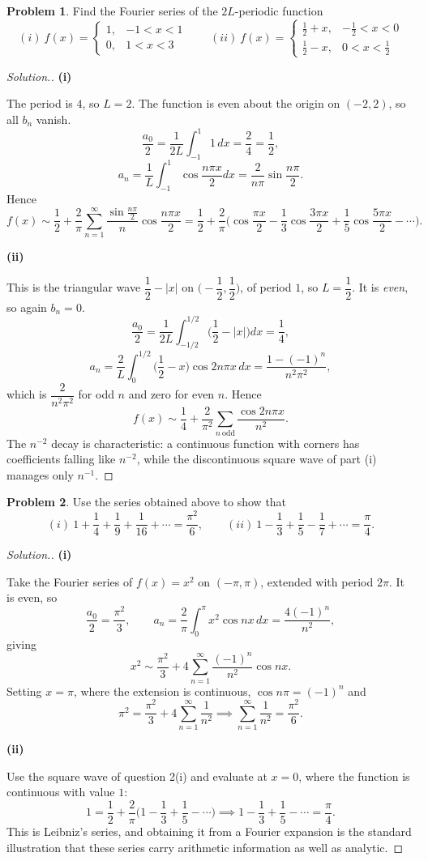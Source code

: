 \documentclass[11pt,a4paper]{article}
\theoremstyle{definition}
\newtheorem{problemx}{Problem}[subsection]
\newenvironment{problem}{\begin{problemx}}{\end{problemx}}
\newenvironment{solution}
  {\renewcommand{\qedsymbol}{}\begin{proof}[\textit{Solution}.]}
  {\end{proof}}
\newcommand{\subhead}[1]{%
  \par\medskip\noindent\textbf{#1}\par\nobreak\smallskip}
\begin{document}
\begin{problem}
Find the Fourier series of the $2L$-periodic function
$$(i)\ f(x) = \begin{cases}1, & -1<x<1\\ 0, & 1<x<3\end{cases}
\qquad
(ii)\ f(x) = \begin{cases}\frac12+x, & -\frac12<x<0\\
\frac12-x, & 0<x<\frac12\end{cases}$$
\end{problem}
\begin{solution}
\subhead{(i)}
The period is $4$, so $L = 2$. The function is even about the origin on
$(-2,2)$, so all $b_n$ vanish.
$$\frac{a_0}{2} = \frac{1}{2L}\int_{-1}^{1}1\,dx = \frac{2}{4} = \frac12 ,$$
$$a_n = \frac1L\int_{-1}^{1}\cos\frac{n\pi x}{2}dx
= \frac{2}{n\pi}\sin\frac{n\pi}{2}.$$
Hence
$$f(x)\sim\frac12 + \frac{2}{\pi}\sum_{n=1}^{\infty}
\frac{\sin\frac{n\pi}{2}}{n}\cos\frac{n\pi x}{2}
= \frac12 + \frac{2}{\pi}\Big(\cos\frac{\pi x}{2}
- \frac13\cos\frac{3\pi x}{2} + \frac15\cos\frac{5\pi x}{2} - \cdots\Big).$$

\subhead{(ii)}
This is the triangular wave $\dfrac12-\left|x\right|$ on
$\Big(-\dfrac12,\dfrac12\Big)$, of period $1$, so $L = \dfrac12$. It is
\emph{even}, so again $b_n = 0$.
$$\frac{a_0}{2} = \frac{1}{2L}\int_{-1/2}^{1/2}\Big(\frac12-\left|x\right|\Big)dx
= \frac14 ,$$
$$a_n = \frac{2}{L}\int_0^{1/2}\Big(\frac12-x\Big)\cos 2n\pi x\,dx
= \frac{1-(-1)^n}{n^2\pi^2},$$
which is $\dfrac{2}{n^2\pi^2}$ for odd $n$ and zero for even $n$. Hence
$$f(x)\sim\frac14 + \frac{2}{\pi^2}\sum_{n\ \text{odd}}
\frac{\cos 2n\pi x}{n^2}.$$
The $n^{-2}$ decay is characteristic: a continuous function with corners has
coefficients falling like $n^{-2}$, while the discontinuous square wave of part
(i) manages only $n^{-1}$.
\end{solution}

\begin{problem}
Use the series obtained above to show that
$$(i)\ 1+\frac14+\frac19+\frac{1}{16}+\cdots = \frac{\pi^2}{6},
\qquad
(ii)\ 1-\frac13+\frac15-\frac17+\cdots = \frac{\pi}{4}.$$
\end{problem}
\begin{solution}
\subhead{(i)}
Take the Fourier series of $f(x) = x^2$ on $(-\pi,\pi)$, extended with period
$2\pi$. It is even, so
$$\frac{a_0}{2} = \frac{\pi^2}{3},\qquad
a_n = \frac{2}{\pi}\int_0^{\pi}x^2\cos nx\,dx = \frac{4(-1)^n}{n^2},$$
giving
$$x^2 \sim \frac{\pi^2}{3} + 4\sum_{n=1}^{\infty}\frac{(-1)^n}{n^2}\cos nx .$$
Setting $x = \pi$, where the extension is continuous, $\cos n\pi = (-1)^n$ and
$$\pi^2 = \frac{\pi^2}{3} + 4\sum_{n=1}^{\infty}\frac{1}{n^2}
\implies \sum_{n=1}^{\infty}\frac{1}{n^2} = \frac{\pi^2}{6}.$$

\subhead{(ii)}
Use the square wave of question 2(i) and evaluate at $x=0$, where the function
is continuous with value $1$:
$$1 = \frac12 + \frac{2}{\pi}\Big(1-\frac13+\frac15-\cdots\Big)
\implies 1-\frac13+\frac15-\cdots = \frac{\pi}{4}.$$
This is Leibniz's series, and obtaining it from a Fourier expansion is the
standard illustration that these series carry arithmetic information as well as
analytic.
\end{solution}
\end{document}
